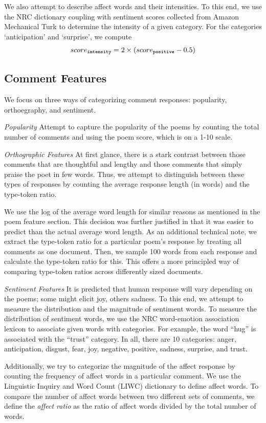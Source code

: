 \documentclass[11pt]{article}
\begin{document}
We also attempt to describe affect words and their intensities. To this end, we use the NRC dictionary coupling with sentiment scores collected from Amazon Mechanical Turk to determine the intensity of a given category. For the categories `anticipation’ and `surprise’, we compute 
$$score_{\tt intensity} = 2 \times ( score_{\tt positive} - 0.5 )$$

\subsection*{Comment Features}
We focus on three ways of categorizing comment responses: popularity, orthoegraphy, and sentiment.

\emph{Popularity}
Attempt to capture the popularity of the poems by counting the total number of comments and using the poem score, which is on a 1-10 scale.

\emph{Orthographic Features}
At first glance, there is a stark contrast between those comments that are thoughtful and lengthy and those comments that simply praise the poet in few words. Thus, we attempt to distinguish between these types of responses by counting the average response length (in words) and the type-token ratio. 

We use the log of the average word length for similar reasons as mentioned in the poem feature section. This decision was further justified in that it was easier to predict than the actual average word length. As an additional technical note, we extract the type-token ratio for a particular poem's response by treating all comments as one document. Then, we sample 100 words from each response and calculate the type-token ratio for this. This offers a more principled way of comparing type-token ratios across differently sized documents.

\emph{Sentiment Features}
It is predicted that human response will vary depending on the poems; some might elicit joy, others sadness. To this end, we attempt to measure the distribution and the magnitude of sentiment words. To measure the distribution of sentiment words, we use the NRC word-emotion association lexicon \cite{mohammad2010emotions} to associate given words with categories. For example, the word ``hug'' is associated with the ``trust'' category. In all, there are 10 categories: anger, anticipation, disgust, fear, joy, negative, positive, sadness, surprise, and trust.

Additionally, we try to categorize the magnitude of the affect response by counting the frequency of affect words in a particular comment. We use the Linguistic Inquiry and Word Count (LIWC) dictionary\cite{pennebaker2001linguistic} to define affect words. To compare the number of affect words between two different sets of comments, we define the \emph{affect ratio} as the ratio of affect words divided by the total number of words.
\end{document}
